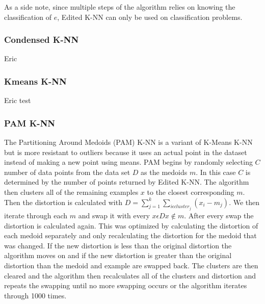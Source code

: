 \documentclass[twoside,11pt]{article}
\begin{document}
As a side note, since multiple steps of the algorithm relies on knowing the classification of $e$, Edited K-NN can only be used on classification problems.



\subsubsection{Condensed K-NN}

Eric

\subsubsection{Kmeans K-NN}

Eric test

\subsubsection{PAM K-NN}
The Partitioning Around Medoids (PAM) K-NN is a variant of K-Means K-NN but is more resistant to outliers because it uses an actual point in the dataset instead of making a new point using means. PAM begins by randomly selecting $C$ number of data points from the data set $D$ as the medoids $m$. In this case $C$ is determined by the number of points returned by Edited K-NN. The algorithm then clusters all of the remaining examples $x$ to the closest corresponding $m$. Then the distortion is calculated with $D = \sum_{j=1}^{k}\sum_{i\epsilon cluster_j} (x_i - m_j)$. We then iterate through each $m$ and swap it with every $x \epsilon D x \notin m$. After every swap the distortion is calculated again. This was optimized by calculating the distortion of each medoid separately and only recalculating the distortion for the medoid that was changed. If the new distortion is less than the original distortion the algorithm moves on and if the new distortion is greater than the original distortion than the medoid and example are swapped back. The clusters are then cleared and the algorithm then recalculates all of the clusters and distortion and repeats the swapping until no more swapping occurs or the algorithm iterates through 1000 times. 
\end{document}

